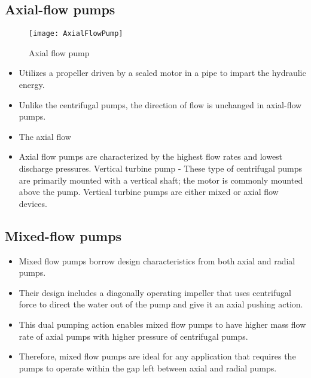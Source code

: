 \subsection{Axial-flow pumps}
\begin{figure}[h!]
\begin{center}
\texttt{[image: AxialFlowPump]}
\caption{Axial flow pump}
\end{center}
\end{figure}
\begin{itemize}
\item Utilizes a propeller driven by a sealed motor in a pipe to impart the hydraulic energy.  \item Unlike the centrifugal pumps, the direction of flow is unchanged in axial-flow pumps.
\item The axial flow 
\item Axial flow pumps are characterized by the highest flow rates and lowest discharge pressures.  
Vertical turbine pump - These type of centrifugal pumps are primarily mounted with a  vertical shaft; the motor is commonly mounted above the pump. Vertical turbine pumps are either mixed or axial flow devices.  

\end{itemize}

\subsection{Mixed-flow pumps}
\begin{itemize}
\item Mixed flow pumps borrow design characteristics from both axial and radial pumps. 
\item Their design includes a diagonally operating impeller that uses centrifugal force to direct the water out of the pump and give it an axial pushing action. 
\item This dual pumping action enables mixed flow pumps to have higher mass flow rate of axial pumps with higher pressure of centrifugal pumps.
\item Therefore, mixed flow pumps are ideal for any application that requires the pumps to operate within the gap left between axial and radial pumps.
\end{itemize}
